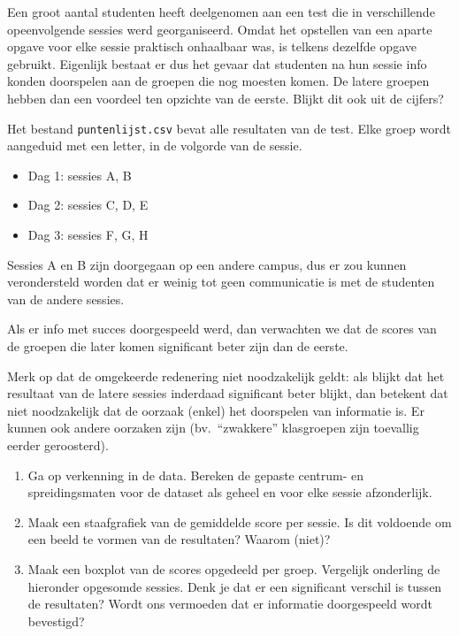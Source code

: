 \begin{exercise}
  Een groot aantal studenten heeft deelgenomen aan een test die in verschillende opeenvolgende sessies werd georganiseerd. Omdat het opstellen van een aparte opgave voor elke sessie praktisch onhaalbaar was, is telkens dezelfde opgave gebruikt. Eigenlijk bestaat er dus het gevaar dat studenten na hun sessie info konden doorspelen aan de groepen die nog moesten komen. De latere groepen hebben dan een voordeel ten opzichte van de eerste. Blijkt dit ook uit de cijfers?
  
  Het bestand \texttt{puntenlijst.csv} bevat alle resultaten van de test. Elke groep wordt aangeduid met een letter, in de volgorde van de sessie.
  
  \begin{itemize}
    \item Dag 1: sessies A, B
    \item Dag 2: sessies C, D, E
    \item Dag 3: sessies F, G, H
  \end{itemize}
  
  Sessies A en B zijn doorgegaan op een andere campus, dus er zou kunnen verondersteld worden dat er weinig tot geen communicatie is met de studenten van de andere sessies.
  
  Als er info met succes doorgespeeld werd, dan verwachten we dat de scores van de groepen die later komen significant beter zijn dan de eerste.
  
  Merk op dat de omgekeerde redenering niet noodzakelijk geldt: als blijkt dat het resultaat van de latere sessies inderdaad significant beter blijkt, dan betekent dat niet noodzakelijk dat de oorzaak (enkel) het doorspelen van informatie is. Er kunnen ook andere oorzaken zijn (bv.~``zwakkere'' klasgroepen zijn toevallig eerder geroosterd).
  
  \begin{enumerate}
    \item Ga op verkenning in de data. Bereken de gepaste centrum- en spreidingsmaten voor de dataset als geheel en voor elke sessie afzonderlijk.
    
    \item Maak een staafgrafiek van de gemiddelde score per sessie. Is dit voldoende om een beeld te vormen van de resultaten? Waarom (niet)?
    
    \item Maak een boxplot van de scores opgedeeld per groep. Vergelijk onderling de hieronder opgesomde sessies. Denk je dat er een significant verschil is tussen de resultaten? Wordt ons vermoeden dat er informatie doorgespeeld wordt bevestigd?
    

\end{enumerate}
\end{exercise}
